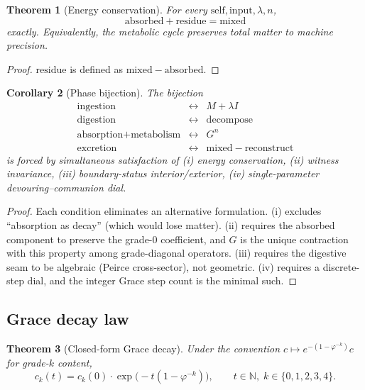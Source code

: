 \documentclass[11pt,a4paper]{article}
\theoremstyle{plain}
\newtheorem{theorem}{Theorem}[section]
\newtheorem{corollary}[theorem]{Corollary}
\theoremstyle{definition}
\theoremstyle{remark}
\numberwithin{equation}{section}
\providecommand{\N}{\mathbb{N}}
\providecommand{\vp}{\varphi}
\begin{document}
\begin{theorem}[Energy conservation]
\label{thm:cycle}
For every $\mathrm{self}, \mathrm{input}, \lambda, n$,
\[
\mathrm{absorbed} + \mathrm{residue} = \mathrm{mixed}
\]
exactly. Equivalently, the metabolic cycle preserves total matter
to machine precision.
\end{theorem}

\begin{proof}
$\mathrm{residue}$ is defined as $\mathrm{mixed} - \mathrm{absorbed}$.
\end{proof}

\begin{corollary}[Phase bijection]
\label{cor:phase-bijection}
The bijection
\[
\begin{array}{rcl}
\text{ingestion} &\longleftrightarrow& M + \lambda I \\
\text{digestion} &\longleftrightarrow& \mathrm{decompose} \\
\text{absorption} + \text{metabolism} &\longleftrightarrow& G^n \\
\text{excretion} &\longleftrightarrow& \mathrm{mixed} - \mathrm{reconstruct}
\end{array}
\]
is forced by simultaneous satisfaction of (i) energy conservation,
(ii) witness invariance, (iii) boundary-status interior/exterior,
(iv) single-parameter devouring--communion dial.
\end{corollary}

\begin{proof}
Each condition eliminates an alternative formulation. (i) excludes
``absorption as decay'' (which would lose matter). (ii) requires
the absorbed component to preserve the grade-$0$ coefficient, and
$G$ is the unique contraction with this property among
grade-diagonal operators. (iii) requires the digestive seam to be
algebraic (Peirce cross-sector), not geometric. (iv) requires a
discrete-step dial, and the integer Grace step count is the
minimal such.
\end{proof}

\subsection{Grace decay law}

\begin{theorem}[Closed-form Grace decay]
\label{thm:decay}
Under the convention $c \mapsto e^{-(1 - \vp^{-k})} c$ for grade-$k$
content,
\[
c_k(t) = c_k(0) \cdot \exp\!\big(-t(1 - \vp^{-k})\big),
\qquad t \in \N,\; k \in \{0,1,2,3,4\}.
\]
\end{theorem}
\end{document}
